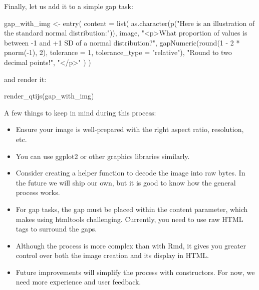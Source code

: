 \documentclass[twoside]{tufte-book}
\newenvironment{Shaded}{}{}
\newcommand{\AttributeTok}[1]{\textcolor[rgb]{0.49,0.56,0.16}{#1}}
\newcommand{\DecValTok}[1]{\textcolor[rgb]{0.25,0.63,0.44}{#1}}
\newcommand{\FunctionTok}[1]{\textcolor[rgb]{0.02,0.16,0.49}{#1}}
\newcommand{\NormalTok}[1]{#1}
\newcommand{\OtherTok}[1]{\textcolor[rgb]{0.00,0.44,0.13}{#1}}
\newcommand{\SpecialCharTok}[1]{\textcolor[rgb]{0.25,0.44,0.63}{#1}}
\newcommand{\StringTok}[1]{\textcolor[rgb]{0.25,0.44,0.63}{#1}}
\providecommand{\tightlist}{%
  \setlength{\itemsep}{0pt}\setlength{\parskip}{0pt}}
\begin{document}
Finally, let us add it to a simple gap task:

\begin{Shaded}
\begin{Highlighting}[]
\NormalTok{gap\_with\_img }\OtherTok{\textless{}{-}} \FunctionTok{entry}\NormalTok{(}
  \AttributeTok{content =} \FunctionTok{list}\NormalTok{(}
    \FunctionTok{as.character}\NormalTok{(}\FunctionTok{p}\NormalTok{(}\StringTok{"Here is an illustration of the standard normal distribution:"}\NormalTok{)), }
\NormalTok{    image, }
    \StringTok{"\textless{}p\textgreater{}What proportion of values is between {-}1 and +1 SD of a normal distribution?"}\NormalTok{,}
    \FunctionTok{gapNumeric}\NormalTok{(}\FunctionTok{round}\NormalTok{(}\DecValTok{1} \SpecialCharTok{{-}} \DecValTok{2} \SpecialCharTok{*} \FunctionTok{pnorm}\NormalTok{(}\SpecialCharTok{{-}}\DecValTok{1}\NormalTok{), }\DecValTok{2}\NormalTok{), }\AttributeTok{tolerance =} \DecValTok{1}\NormalTok{, }
               \AttributeTok{tolerance\_type =} \StringTok{"relative"}\NormalTok{),}
    \StringTok{"Round to two decimal points!"}\NormalTok{,}
    \StringTok{"\textless{}/p\textgreater{}"}
\NormalTok{  )}
\NormalTok{)}
\end{Highlighting}
\end{Shaded}

and render it:

\begin{Shaded}
\begin{Highlighting}[]
\FunctionTok{render\_qtijs}\NormalTok{(gap\_with\_img)}
\end{Highlighting}
\end{Shaded}

A few things to keep in mind during this process:

\begin{itemize}
\tightlist
\item
  Ensure your image is well-prepared with the right aspect ratio, resolution, etc.
\item
  You can use ggplot2 or other graphics libraries similarly.
\item
  Consider creating a helper function to decode the image into raw bytes. In the future we will ship our own, but it is good to know how the general process works.
\item
  For gap tasks, the gap must be placed within the content parameter, which makes using htmltools challenging. Currently, you need to use raw HTML tags to surround the gaps.
\item
  Although the process is more complex than with Rmd, it gives you greater control over both the image creation and its display in HTML.
\item
  Future improvements will simplify the process with constructors. For now, we need more experience and user feedback.
\end{itemize}
\end{document}
